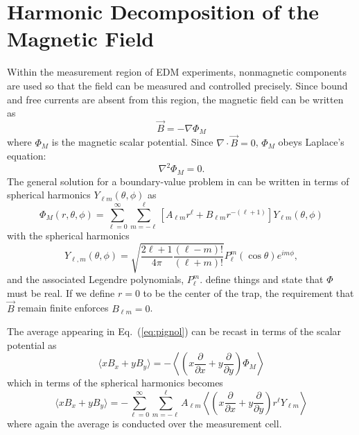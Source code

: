 \documentclass[preprint,12pt]{elsarticle}
\begin{document}
\section{Harmonic Decomposition of the Magnetic Field}

Within the measurement region of EDM experiments, nonmagnetic
components are used so that the field can be measured and controlled
precisely.  Since bound and free currents are absent from this region,
the magnetic field can be written as~\cite{bib:jackson}
\begin{equation}
\vec{B}=-\nabla\Phi_M
\end{equation}
where $\Phi_M$ is the magnetic scalar potential.  Since
$\nabla\cdot\vec{B}=0$, $\Phi_M$ obeys Laplace's equation:
\begin{equation}
\nabla^2\Phi_M=0.
\end{equation}
The general solution for a boundary-value problem in can be written in
terms of spherical harmonics $Y_{\ell m}(\theta,\phi)$ as
\begin{equation}\label{eq:boundaryvalue}
  \Phi_M(r,\theta,\phi)=\sum_{\ell=0}^\infty\sum_{m=-\ell}^\ell\left[A_{\ell m}r^\ell+B_{\ell m}r^{-(\ell+1)}\right]Y_{\ell m}(\theta,\phi)
\end{equation}
with the spherical harmonics
\begin{equation}
    Y_{\ell,m}(\theta,\phi)=\sqrt{\frac{2\ell+1}{4\pi}\frac{(\ell-m)!}{(\ell+m)!}}P_{\ell}^{m}(\cos\theta)e^{im\phi},
\end{equation}
and the associated Legendre polynomials, $P_{\ell}^{m}$. define things and state that $\Phi$ must be real.  If we
define $r=0$ to be the center of the trap, the requirement that
$\vec{B}$ remain finite enforces $B_{\ell m}=0$.

The average appearing in Eq.~(\ref{eq:pignol}) can be recast in terms
of the scalar potential as
\begin{equation}
  \langle xB_x+yB_y\rangle=-\left\langle\left(x\frac{\partial}{\partial
    x}+y\frac{\partial}{\partial y}\right)\Phi_M\right\rangle
\end{equation}
which in terms of the spherical harmonics becomes
\begin{equation}
  \label{eq:xb}
  \langle xB_x+yB_y\rangle=-\sum_{\ell=0}^\infty\sum_{m=-\ell}^\ell
  A_{\ell m}\left\langle\left(x\frac{\partial}{\partial
    x}+y\frac{\partial}{\partial y}\right)r^\ell Y_{\ell
    m}\right\rangle
\end{equation}
where again the average is conducted over the measurement cell.
\end{document}
